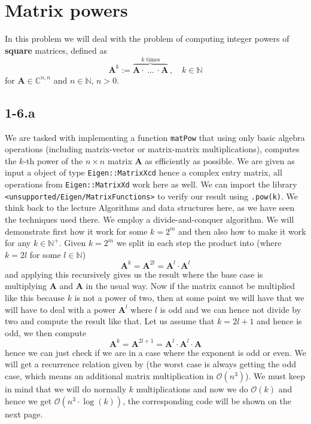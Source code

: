 \documentclass{article}
\begin{document}
\section*{Matrix powers}
In this problem we will deal with the problem of computing integer powers of \textbf{square} matrices, defined as
\begin{equation*}
    \mathbf{A}^{k} := \overbrace{\mathbf{A}\cdot \: \dots \: \cdot \mathbf{A}}^{k \text{ times}} \,,\quad k \in \mathbb{N}
\end{equation*}
for $\mathbf{A} \in \mathbb{C}^{n,n}$ and $n \in \mathbb{N}$, $n > 0$.
\subsection*{1-6.a}
We are tasked with implementing a function \verb|matPow| that using only basic algebra operations (including matrix-vector or matrix-matrix multiplications), computes the $k$-th power of the $n \times n$ matrix $\mathbf{
A}$ as efficiently as possible. We are given as input a object of type \verb|Eigen::MatrixXcd| hence a complex entry matrix, all operations from \verb|Eigen::MatrixXd| work here as well. We can import the library \verb|<unsupported/Eigen/MatrixFunctions>| to verify our result using \verb|.pow(k)|. We think back to the lecture Algorithms and data structures here, as we have seen the techniques used there. We employ a divide-and-conquer algorithm. We will demonstrate first how it work for some $k = 2^{m}$ and then also how to make it work for any $k \in \mathbb{N}^{+}$. Given $k = 2^{m}$ we split in each step the product into (where $k = 2l$ for some $l \in \mathbb{N}$)
\begin{equation}
    \mathbf{A}^{k} = \mathbf{A}^{2l} = \mathbf{A}^{l} \cdot \mathbf{A}^{l}
\end{equation}
and applying this recursively gives us the result where the base case is multiplying $\mathbf{A}$ and $\mathbf{A}$ in the usual way. Now if the matrix cannot be multiplied like this because $k$ is not a power of two, then at some point we will have that we will have to deal with a power $\mathbf{A}^{l}$ where $l$ is odd and we can hence not divide by two and compute the result like that. Let us assume that $k=2l + 1$ and hence is odd, we then compute
\begin{equation*}
    \mathbf{A}^{k} = \mathbf{A}^{2l+1} = \mathbf{A}^{l} \cdot \mathbf{A}^{l} \cdot \mathbf{A}
\end{equation*}
hence we can just check if we are in a case where the exponent is odd or even. We will get a recurrence relation given by (the worst case is always getting the odd case, which means an additional matrix multiplication in $\mathcal{O}\left(n^{3}\right)$). We must keep in mind that we will do normally $k$ multiplications and now we do $\mathcal{O}\left(k\right)$ and hence we get $\mathcal{O}\left(n^{3} \cdot \log\left(k\right)\right)$, the corresponding code will be shown on the next page. 
\end{document}
